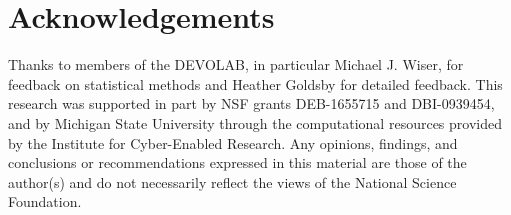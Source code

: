\section{Acknowledgements}

Thanks to members of the DEVOLAB, in particular Michael J. Wiser, for feedback on statistical methods and Heather Goldsby for detailed feedback.
This research was supported in part by NSF grants DEB-1655715 and DBI-0939454, and by Michigan State University through the computational resources provided by the Institute for Cyber-Enabled Research.
Any opinions, findings, and conclusions or recommendations expressed in this material are those of the author(s) and do not necessarily reflect the views of the National Science Foundation.
